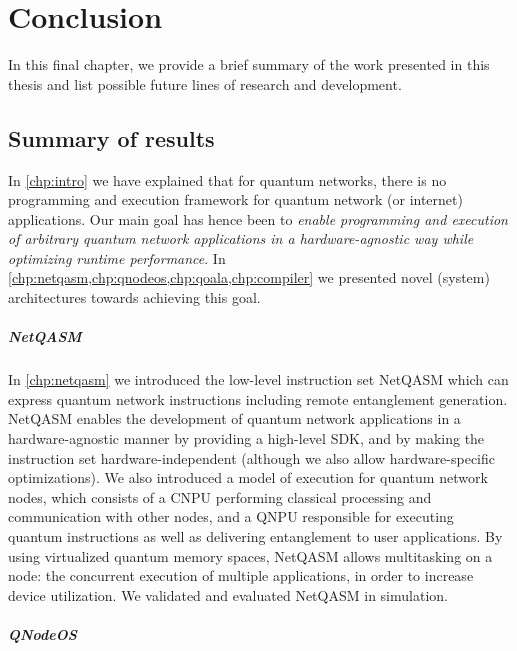 \chapter{Conclusion}
\label{chp:conclusion}

In this final chapter, we provide a brief summary of the work presented in this thesis and list possible future lines of research and development.

\section{Summary of results}
In \cref{chp:intro} we have explained that for quantum networks, there is no programming and execution framework for quantum network (or internet) applications.
Our main goal has hence been to \emph{enable programming and execution of arbitrary quantum network applications in a hardware-agnostic way while optimizing runtime performance}.
In \cref{chp:netqasm,chp:qnodeos,chp:qoala,chp:compiler} we presented novel (system) architectures towards achieving this goal.


\paragraph{NetQASM}
In \cref{chp:netqasm} we introduced the low-level instruction set NetQASM which can express quantum network instructions including remote entanglement generation.
NetQASM enables the development of quantum network applications in a hardware-agnostic manner by providing a high-level SDK, and by making the instruction set hardware-independent (although we also allow hardware-specific optimizations).
We also introduced a model of execution for quantum network nodes, which consists of a CNPU performing classical processing and communication with other nodes, and a QNPU responsible for executing quantum instructions as well as delivering entanglement to user applications.
By using virtualized quantum memory spaces, NetQASM allows multitasking on a node: the concurrent execution of multiple applications, in order to increase device utilization.
We validated and evaluated NetQASM in simulation.


\paragraph{QNodeOS}

